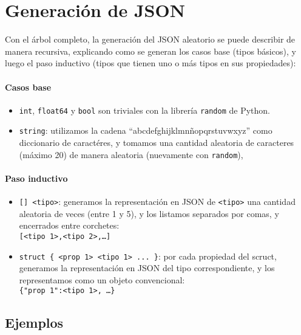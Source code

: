 \section{Generación de JSON}
\label{sec:json}

Con el árbol completo, la generación del JSON aleatorio se puede describir de
manera recursiva, explicando como se generan los casos base (tipos básicos), y
luego el paso inductivo (tipos que tienen uno o más tipos en sus propiedades):

\paragraph{Casos base}

\begin{itemize}
    \item \texttt{int}, \texttt{float64} y \texttt{bool} son triviales con la
        librería \texttt{random} de Python.
    \item \texttt{string}: utilizamos la cadena ``abcdefghijklmnñopqrstuvwxyz''
        como diccionario de caractéres, y tomamos una cantidad aleatoria de
        caracteres (máximo 20) de manera aleatoria (nuevamente con
        \texttt{random}),
\end{itemize}

\paragraph{Paso inductivo}

\begin{itemize}
    \item \texttt{[] <tipo>}: generamos la representación en JSON de \texttt{<tipo>} una
        cantidad aleatoria de veces (entre 1 y 5), y los listamos separados por comas, y
        encerrados entre corchetes:\\
        \texttt{[<tipo 1>,<tipo 2>,\dots]}
    \item \texttt{struct \{ <prop 1>~<tipo 1>~... \}}: por cada propiedad del
        scruct, generamos la representación en JSON del tipo correspondiente, y
        los representamos como un objeto convencional: \\
        \texttt{\{"prop 1":<tipo 1>, \dots\}}
\end{itemize}

\subsection{Ejemplos}

